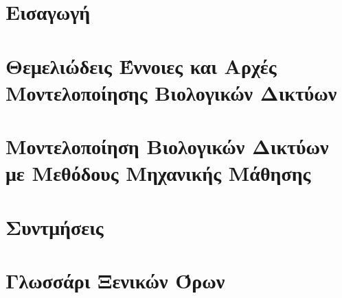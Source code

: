 \documentclass[a4paper,11pt,oneside,openany]{ioniothesis}
\begin{document}
\renewcommand*\contentsname{Περιεχόμενα}
\renewcommand*\listfigurename{Κατάλογος Σχημάτων}
\renewcommand*\listtablename{Κατάλογος Πινάκων}
\renewcommand\bibname{Βιβλιογραφία}
\renewcommand\chaptername{Κεφάλαιο}
\renewcommand\tablename{Πίνακας}
\renewcommand\figurename{Σχήμα}

\tableofcontents

\cleardoublepage

\listoffigures
\cleardoublepage
\listoftables

\setlength{\parskip}{5pt}



\pagestyle{headings}
\cleardoublepage


\newpage
{}


\cleardoublepage


\chapter{Εισαγωγή} \label{chapter:intro}




\chapter{Θεμελιώδεις Έννοιες και Αρχές Μοντελοποίησης Βιολογικών Δικτύων} \label{chapter:kefalaio-b}



\chapter{Μοντελοποίηση Βιολογικών Δικτύων με Μεθόδους Μηχανικής Μάθησης} \label{chapter:kefalaio-c}





\printbibliography %


\chapter*{Συντμήσεις} \pagestyle{empty}



\chapter*{Γλωσσάρι Ξενικών Όρων} \pagestyle{empty}






\newpage
{}
\printindex
\end{document}
